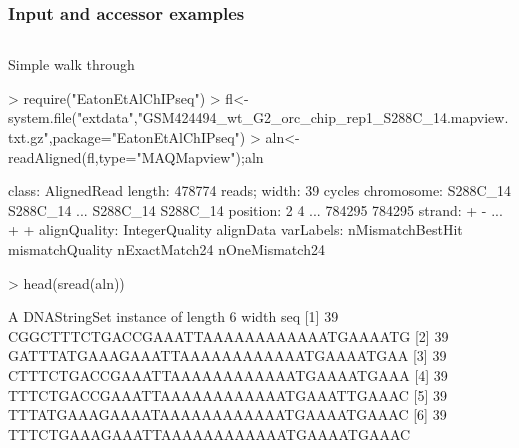 \documentclass{beamer}
\begin{document}

\begin{frame}[fragile]
\frametitle{Input and accessor examples}
\begin{column}{1\textwidth}
  \bit
      \item Simple walk through
            \begin{uncoverenv}
\begin{Schunk}
\begin{Sinput}
> require("EatonEtAlChIPseq")
> fl<-system.file("extdata","GSM424494_wt_G2_orc_chip_rep1_S288C_14.mapview.txt.gz",package="EatonEtAlChIPseq")
> aln<-readAligned(fl,type="MAQMapview");aln
\end{Sinput}
\begin{Soutput}
class: AlignedRead
length: 478774 reads; width: 39 cycles
chromosome: S288C_14 S288C_14 ... S288C_14 S288C_14 
position: 2 4 ... 784295 784295 
strand: + - ... + + 
alignQuality: IntegerQuality 
alignData varLabels: nMismatchBestHit mismatchQuality nExactMatch24 nOneMismatch24 
\end{Soutput}
\begin{Sinput}
> head(sread(aln))
\end{Sinput}
\begin{Soutput}
  A DNAStringSet instance of length 6
    width seq
[1]    39 CGGCTTTCTGACCGAAATTAAAAAAAAAAAATGAAAATG
[2]    39 GATTTATGAAAGAAATTAAAAAAAAAAAATGAAAATGAA
[3]    39 CTTTCTGACCGAAATTAAAAAAAAAAAATGAAAATGAAA
[4]    39 TTTCTGACCGAAATTAAAAAAAAAAAATGAAATTGAAAC
[5]    39 TTTATGAAAGAAAATAAAAAAAAAAAATGAAAATGAAAC
[6]    39 TTTCTGAAAGAAATTAAAAAAAAAAAATGAAAATGAAAC
\end{Soutput}
\end{Schunk}
       \end{uncoverenv} 
  \eit
  \end{column}
\end{frame}

\end{document}
